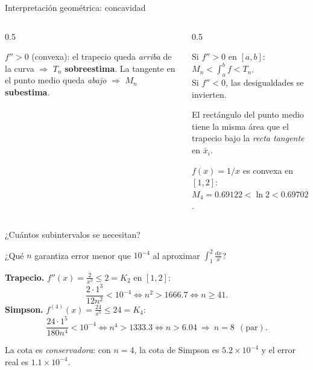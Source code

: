 \documentclass[10pt,aspectratio=169]{beamer}
\begin{document}
\begin{frame}{Interpretación geométrica: concavidad}
  \begin{columns}
    \begin{column}{0.5\textwidth}
      \centering

      \small $f''>0$ (convexa): el trapecio queda \emph{arriba} de la curva $\Rightarrow$ $T_n$ \textbf{sobreestima}.
      La tangente en el punto medio queda \emph{abajo} $\Rightarrow$ $M_n$ \textbf{subestima}.
    \end{column}
    \begin{column}{0.5\textwidth}
      \begin{proposicion}
        Si $f''>0$ en $[a,b]$:\qquad $M_n<\displaystyle\int_a^bf<T_n$.\\
        Si $f''<0$, las desigualdades se invierten.
      \end{proposicion}
      \begin{observacion}
        El rectángulo del punto medio tiene la misma área que el trapecio bajo la \emph{recta tangente} en $\bar x_i$.
      \end{observacion}
      \begin{ejemplo}
        $f(x)=1/x$ es convexa en $[1,2]$: \
        $M_4=0.69122<\ln2<0.69702=T_4$. \checkmark
      \end{ejemplo}
    \end{column}
  \end{columns}
\end{frame}

\begin{frame}{¿Cuántos subintervalos se necesitan?}
  \begin{ejemplo}[1]
    ¿Qué $n$ garantiza error menor que $10^{-4}$ al aproximar $\displaystyle\int_1^2\frac{dx}{x}$?

    \textbf{Trapecio.} $f''(x)=\frac2{x^3}\le2=K_2$ en $[1,2]$:
    \[ \frac{2\cdot1^3}{12n^2}<10^{-4}\iff n^2>1666.7\iff n\ge41. \]
    \textbf{Simpson.} $f^{(4)}(x)=\frac{24}{x^5}\le24=K_4$:
    \[ \frac{24\cdot1^5}{180n^4}<10^{-4}\iff n^4>1333.3\iff n>6.04\ \Rightarrow\ n=8\ \ (\text{par}). \]
  \end{ejemplo}
  \begin{observacion}
    La cota es \emph{conservadora}: con $n=4$, la cota de Simpson es $5.2\times10^{-4}$ y el error real es $1.1\times10^{-4}$.
  \end{observacion}
\end{frame}
\end{document}
